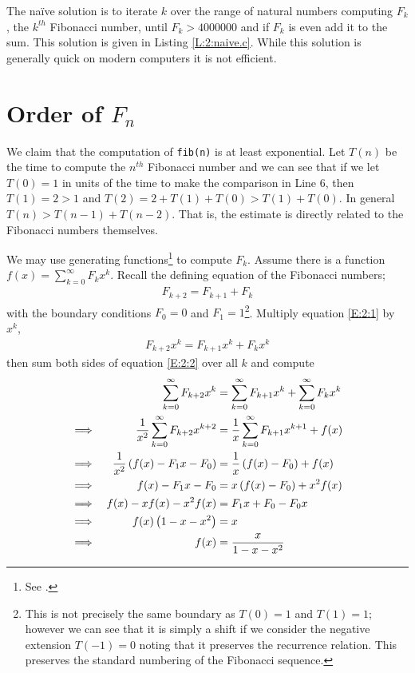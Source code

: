 \documentclass[oneside,12pt]{book}   	%
\newcounter{ex}
\newcounter{def}
\newcounter{pr}
\theoremstyle{definition}
\begin{document}
\begin{spacing}{1.618}
			The na\"ive solution is to iterate $k$ over the range of natural numbers computing $F_k$, the $k^{th}$ Fibonacci number, until $F_k>4000000$ and if $F_k$ is even add it to the sum. This solution is given in Listing \ref{L:2:naive.c}. While this solution is generally quick on modern computers it is not efficient. 
			
			
		\section{Order of $F_n$}\label{S:2:1}
			We claim that the computation of \texttt{fib(n)} is at least exponential. Let $T(n)$ be the time to compute the $n^{th}$ Fibonacci number and we can see that if we let $T(0)=1$ in units of the time to make the comparison in Line 6, then $T(1)=2 > 1$ and $T(2)=2+T(1)+T(0)> T(1)+T(0)$. In general $T(n)> T(n-1)+T(n-2)$. That is, the estimate is directly related to the Fibonacci numbers themselves.
			
			We may use generating functions\footnote{See \cite{Wilf2006,GKP94}.} to compute $F_k$. Assume there is a function $f(x)=\sum_{k=0}^\infty F_kx^k$. Recall the defining equation of the Fibonacci numbers;
			\begin{alignat}{4}
				F_{k+2}=F_{k+1}+F_k \label{E:2:1}
			\end{alignat}
			with the boundary conditions $F_0=0$ and $F_1=1$\footnote{This is not precisely the same boundary as $T(0)=1$ and $T(1)=1$; however we can see that it is simply a shift if we consider the negative extension $T(-1)=0$ noting that it preserves the recurrence relation. This preserves the standard numbering of the Fibonacci sequence.}. Multiply equation \ref{E:2:1} by $x^k$,
			\begin{alignat}{4}
				F_{k+2}x^k=F_{k+1}x^k+F_kx^k \label{E:2:2}
			\end{alignat}
			then sum both sides of equation \ref{E:2:2} over all $k$ and compute
			\begin{alignat}{4}
					&&\sum_{k=0}^\infty F_{k+2}x^k&=\sum_{k=0}^\infty F_{k+1}x^k +\sum_{k=0}^\infty F_kx^k \notag \\
				\implies &&\frac{1}{x^2}\sum_{k=0}^\infty F_{k+2}x^{k+2}&=\frac{1}{x}\sum_{k=0}^\infty F_{k+1}x^{k+1} +f(x) \notag \\
				\implies && \frac{1}{x^2}\left(f(x)-F_1x-F_0\right)&=\frac{1}{x}\left(f(x)-F_0\right) + f(x) \notag \\
				\implies && f(x)-F_1x-F_0&=x\left(f(x)-F_0\right)+x^2f(x) \notag \\
				\implies && f(x)-xf(x)-x^2f(x)&=F_1x+F_0-F_0x \notag \\
				\implies && f(x)\left(1-x-x^2\right)&=x \notag \\
				\implies && f(x)&=\frac{x}{1-x-x^2} \label{E:2:3}
			\end{alignat}
			

\end{spacing}
\end{document}
